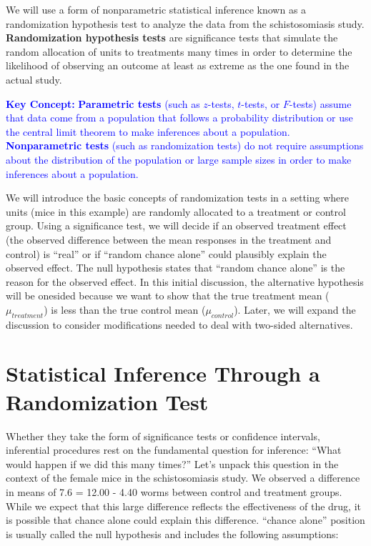 \documentclass[
]{report}
\begin{document}
We will use a form of nonparametric statistical inference known as a randomization hypothesis test to analyze the data from the schistosomiasis study. \textbf{Randomization hypothesis tests} are significance tests that simulate the random allocation of units to treatments many times in order to determine the likelihood of observing an outcome at least as extreme as the one found in the actual study.

\textbf{\textcolor{blue}{Key Concept:}}
\textcolor{blue}{\textbf{Parametric tests} (such as $z$-tests, $t$-tests, or $F$-tests) assume that data come from a population that follows a probability distribution or use the central limit theorem to make inferences about a population. \textbf{Nonparametric tests} (such as randomization tests) do not require assumptions about the distribution of the population or large sample sizes in order to make inferences about a population.}

We will introduce the basic concepts of randomization tests in a setting where units (mice in this example) are randomly allocated to a treatment or control group. Using a significance test, we will decide if an observed treatment effect (the observed difference between the mean responses in the treatment and control) is ``real'' or if ``random chance alone'' could plausibly explain the observed effect. The null hypothesis states that ``random chance alone'' is the reason for the observed effect. In this initial discussion, the alternative hypothesis will be onesided because we want to show that the true treatment mean (\(\mu_{treatment}\)) is less than the true control mean (\(\mu_{control}\)). Later, we will expand the discussion to consider modifications needed to deal with two-sided alternatives.

\hypertarget{statistical-inference-through-a-randomization-test}{%
\section{\texorpdfstring{\textbf{Statistical Inference Through a Randomization Test}}{Statistical Inference Through a Randomization Test}}\label{statistical-inference-through-a-randomization-test}}

Whether they take the form of significance tests or confidence intervals, inferential procedures rest on the fundamental question for inference: ``What would happen if we did this many times?'' Let's unpack this question in the context of the female mice in the schistosomiasis study. We observed a difference in means of 7.6 = 12.00 - 4.40 worms between control and treatment groups. While we expect that this large difference reflects the effectiveness of the drug, it is possible that chance alone could explain this difference. ``chance alone'' position is usually called the null hypothesis and includes the following assumptions:
\end{document}
